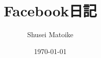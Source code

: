 \usepackage[dvipdfmx]{graphicx}
\usepackage[dvipdfmx]{hyperref}
\usepackage{pxjahyper}
\usepackage{geometry}
\usepackage{url}
\usepackage{subfiles}

\geometry{margin=25mm}

\title{Facebook日記}
\author{Shusei Matoike}
\date{\today}
